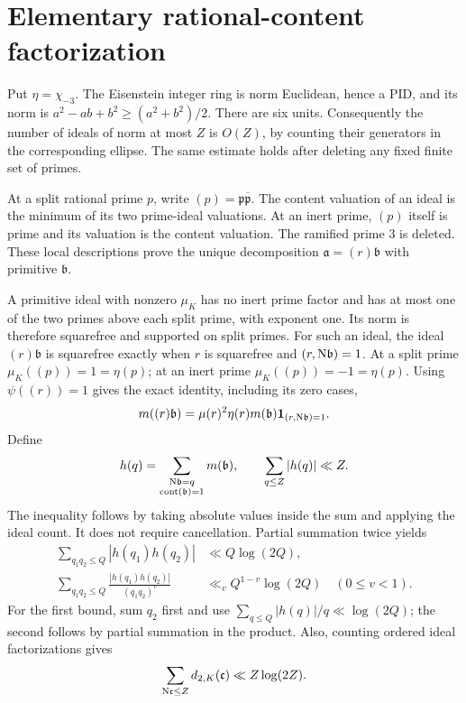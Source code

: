 \section{Elementary rational-content factorization}
Put \(\eta=\chi_{-3}\).  The Eisenstein integer ring is norm
Euclidean, hence a PID, and its norm is
\(a^2-ab+b^2\ge(a^2+b^2)/2\).
There are six units.  Consequently the number of ideals of norm
at most \(Z\) is \(O(Z)\), by counting their generators in the
corresponding ellipse.  The same estimate holds after deleting
any fixed finite set of primes.

At a split rational prime \(p\), write
\((p)=\mathfrak p\overline{\mathfrak p}\).
The content valuation of an ideal is the minimum of its two
prime-ideal valuations.  At an inert prime, \((p)\) itself is
prime and its valuation is the content valuation.
The ramified prime 3 is deleted.  These local descriptions prove
the unique decomposition
\(\mathfrak a=(r)\mathfrak b\) with primitive \(\mathfrak b\).

A primitive ideal with nonzero \(\mu_K\) has no inert prime
factor and has at most one of the two primes above each split
prime, with exponent one.  Its norm is therefore squarefree and
supported on split primes.  For such an ideal, the ideal
\((r)\mathfrak b\) is squarefree exactly when \(r\) is squarefree
and \((r,\mathrm N\mathfrak b)=1\).
At a split prime \(\mu_K((p))=1=\eta(p)\); at an inert prime
\(\mu_K((p))=-1=\eta(p)\).  Using \(\psi((r))=1\) gives the
exact identity, including its zero cases,
\begin{equation}
 m((r)\mathfrak b)=\mu(r)^2\eta(r)m(\mathfrak b)
                         \mathbf1_{(r,\mathrm N\mathfrak b)=1}.
 \label{jct:content-factorization}
\end{equation}
Define
\begin{equation}
 h(q)=\sum_{\substack{\mathrm N\mathfrak b=q\\\operatorname{cont}(\mathfrak b)=1}}
 m(\mathfrak b),\qquad
 \sum_{q\le Z}|h(q)|\ll Z.
 \label{jct:primitive-count}
\end{equation}
The inequality follows by taking absolute values inside the sum
and applying the ideal count.  It does not require cancellation.
Partial summation twice yields
\begin{align}
 \sum_{q_1q_2\le Q}|h(q_1)h(q_2)|&\ll Q\log(2Q),
 \label{jct:pair-count}\\
 \sum_{q_1q_2\le Q}\frac{|h(q_1)h(q_2)|}{(q_1q_2)^v}
 &\ll_v Q^{1-v}\log(2Q)\quad(0\le v<1).
 \label{jct:weighted-pair-count}
\end{align}
For the first bound, sum \(q_2\) first and use
\(\sum_{q\le Q}|h(q)|/q\ll\log(2Q)\); the second follows
by partial summation in the product.
Also, counting ordered ideal factorizations gives
\begin{equation}
 \sum_{\mathrm N\mathfrak c\le Z}d_{2,K}(\mathfrak c)
 \ll Z\log(2Z).
 \label{jct:divisor-count}
\end{equation}

